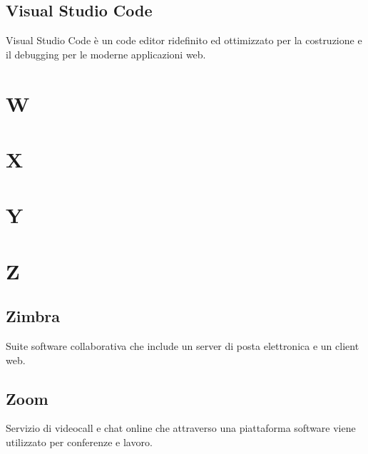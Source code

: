 \subsection*{Visual Studio Code}
Visual Studio Code è un code editor ridefinito ed ottimizzato per la costruzione e il debugging per le moderne applicazioni web.

\section*{W}


\section*{X}


\section*{Y}


\section*{Z}
\subsection*{Zimbra}
Suite software collaborativa che include un server di posta elettronica e un client web.

\subsection*{Zoom}
Servizio di videocall e chat online che attraverso una piattaforma software viene utilizzato per conferenze e lavoro.
